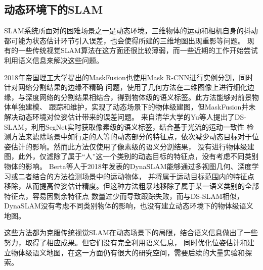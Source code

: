 \subsection{动态环境下的SLAM}
SLAM系统所面对的困难场景之一是动态环境，三维物体的运动和相机自身的抖动都可能为状态估计环节引入误差，也会使得所建的三维地图出现重影等问题。
现有的一些传统视觉SLAM算法在这方面还很比较薄弱，而一些近期的工作开始尝试利用语义信息来解决这些问题。

2018年帝国理工大学提出的MaskFusion\citep{runz2018maskfusion}也使用Mask R-CNN进行实例分割，同时针对网络分割结果的边缘不精确
问题，使用了几何方法在二维图像上进行细化边缘，与深度网络的分割结果相结合，得到物体级的语义标签。此方法能够对前景物体单独建模、
跟踪和维护，实现了动态场景下的物体级建图，但MaskFusion并未解决动态环境对位姿估计带来的误差问题。
来自清华大学的Yu等人提出了DS-SLAM\citep{YuDS}，利用SegNet\citep{VijaySegNet}实时获取像素级的语义标签，结合基于光流的运动一致性
检测方法来滤除场景中如行走的人等的动态部分的特征点，依次减少动态目标对于位姿估计的影响。然而此方法仅使用了像素级的语义分割结果，
没有进行物体级建图，此外，仅滤除了属于“人”这一个类别的动态目标的特征点，没有考虑不同类别物体的影响。
Berta等人于2018年发表的DynaSLAM\citep{BertaDynaSLAM}能够通过多视图几何、深度学习或二者结合的方法检测场景中的运动物体，
并将属于运动目标范围内的特征点移除，从而提高位姿估计精度。但这种方法粗暴地移除了属于某一语义类别的全部特征点，容易因剩余特征点
数量过少而导致跟踪失败，而与DS-SLAM相似，DynaSLAM没有考虑不同类别物体的影响，也没有建立动态环境下的物体级语义地图。

这些方法都为克服传统视觉SLAM在动态场景下的局限，结合语义信息做出了一些努力，取得了相应成果。但它们没有完全利用语义信息，
同时优化位姿估计和建立物体级语义地图，在这一方面仍有很大的研究空间，需要后续的大量实验和探索。


